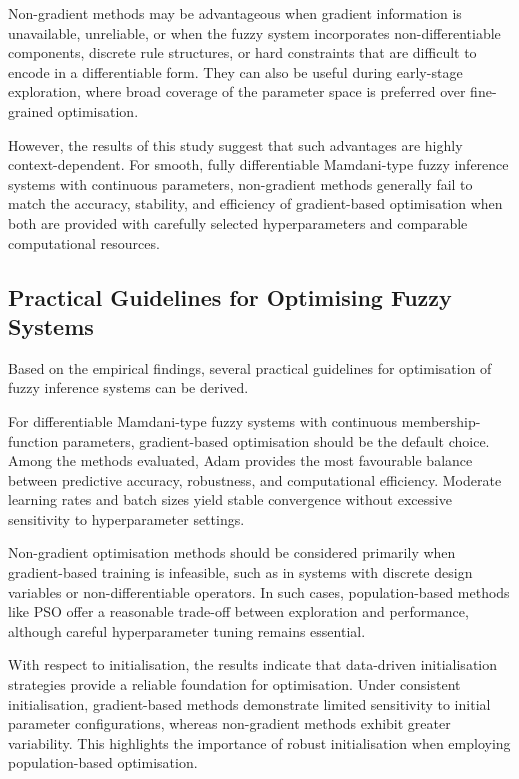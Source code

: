 \documentclass[a4paper,12pt,oneside]{article}
\begin{document}
Non-gradient methods may be advantageous when gradient information is unavailable, unreliable, or when the fuzzy system incorporates non-differentiable components, discrete rule structures, or hard constraints that are difficult to encode in a differentiable form. They can also be useful during early-stage exploration, where broad coverage of the parameter space is preferred over fine-grained optimisation.

However, the results of this study suggest that such advantages are highly context-dependent. For smooth, fully differentiable Mamdani-type fuzzy inference systems with continuous parameters, non-gradient methods generally fail to match the accuracy, stability, and efficiency of gradient-based optimisation when both are provided with carefully selected hyperparameters and comparable computational resources.

\subsection{Practical Guidelines for Optimising Fuzzy Systems}

Based on the empirical findings, several practical guidelines for optimisation of fuzzy inference systems can be derived.

For differentiable Mamdani-type fuzzy systems with continuous membership-function parameters, gradient-based optimisation should be the default choice. Among the methods evaluated, Adam provides the most favourable balance between predictive accuracy, robustness, and computational efficiency. Moderate learning rates and batch sizes yield stable convergence without excessive sensitivity to hyperparameter settings.

Non-gradient optimisation methods should be considered primarily when gradient-based training is infeasible, such as in systems with discrete design variables or non-differentiable operators. In such cases, population-based methods like PSO offer a reasonable trade-off between exploration and performance, although careful hyperparameter tuning remains essential.

With respect to initialisation, the results indicate that data-driven initialisation strategies provide a reliable foundation for optimisation. Under consistent initialisation, gradient-based methods demonstrate limited sensitivity to initial parameter configurations, whereas non-gradient methods exhibit greater variability. This highlights the importance of robust initialisation when employing population-based optimisation.
\end{document}
